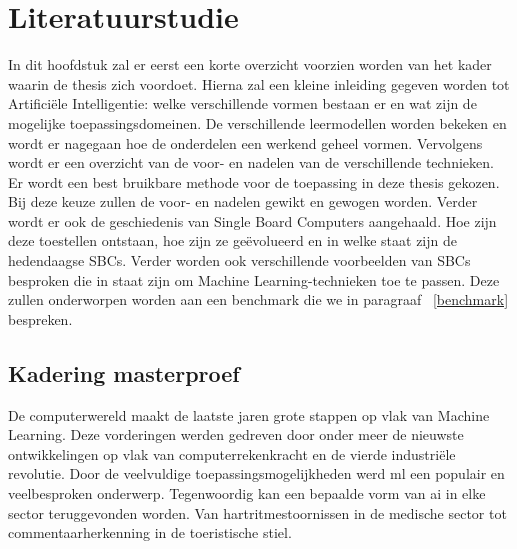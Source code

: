 \chapter{Literatuurstudie}

In dit hoofdstuk zal er eerst een korte overzicht voorzien worden van het kader waarin de thesis zich voordoet. Hierna zal een kleine inleiding gegeven worden tot Artifici\"ele Intelligentie: welke verschillende vormen bestaan er en wat zijn de mogelijke toepassingsdomeinen. De verschillende leermodellen worden bekeken en wordt er nagegaan hoe de onderdelen een werkend geheel vormen.  Vervolgens wordt er een overzicht van de voor- en nadelen van de verschillende technieken. Er wordt een best bruikbare methode voor de toepassing in deze thesis gekozen. Bij deze keuze zullen de voor- en nadelen gewikt en gewogen worden. Verder wordt er ook de geschiedenis van Single Board Computers aangehaald. Hoe zijn deze toestellen ontstaan, hoe zijn ze ge\"evolueerd en in welke staat zijn de hedendaagse SBCs. Verder worden ook verschillende voorbeelden van SBCs besproken die in staat zijn om Machine Learning-technieken toe te passen. Deze zullen onderworpen worden aan een benchmark die we in paragraaf ~\ref{benchmark} bespreken.

\newpage

\section{Kadering masterproef}

De computerwereld maakt de laatste jaren grote stappen op vlak van Machine Learning\cite{Minar18}. Deze vorderingen werden gedreven door onder meer de nieuwste ontwikkelingen op vlak van computerrekenkracht en de vierde industri\"ele revolutie\cite{bloem2014fourth}. Door de veelvuldige toepassingsmogelijkheden werd \gls{ml} een populair en veelbesproken onderwerp. Tegenwoordig kan een bepaalde vorm van \gls{ai} in elke sector teruggevonden worden. Van hartritmestoornissen in de medische sector tot commentaarherkenning in de toeristische stiel. 

